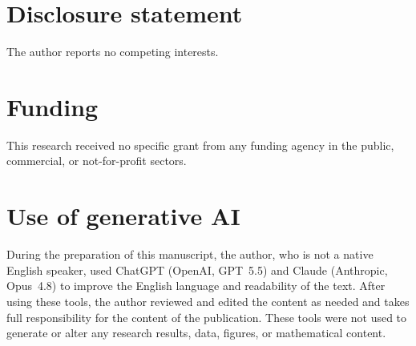 \documentclass[]{interact}%
\begin{document}
\section*{Disclosure statement}
The author reports no competing interests.

\section*{Funding}
This research received no specific grant from any funding agency in the public, commercial, or
not-for-profit sectors.

\section*{Use of generative AI}
During the preparation of this manuscript, the author, who is not a native English speaker, used
ChatGPT (OpenAI, GPT~5.5) and Claude (Anthropic, Opus~4.8) to improve the English language and
readability of the text. After using these tools, the author reviewed and edited the content as
needed and takes full responsibility for the content of the publication. These tools were not used
to generate or alter any research results, data, figures, or mathematical content.
\end{document}
